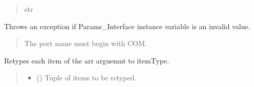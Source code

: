 \documentclass[letterpaper,10pt,english]{sphinxmanual}
\begin{document}
\begin{fulllineitems}
\begin{fulllineitems}
\begin{quote}
\begin{description}
\sphinxAtStartPar
str

\end{description}\end{quote}

\end{fulllineitems}


\begin{fulllineitems}
\label{\detokenize{Setup_PodParameters:Setup_PodParameters.Params_Interface._CheckParams}}
\pysigstartsignatures
{}
\pysigstopsignatures
\sphinxAtStartPar
Throws an exception if Params\_Interface instance variable is an invalid value.
\begin{quote}\begin{description}
\sphinxAtStartPar
{} \textendash{} The port name must begin with COM.

\end{description}\end{quote}

\end{fulllineitems}


\begin{fulllineitems}
\label{\detokenize{Setup_PodParameters:Setup_PodParameters.Params_Interface._FixTypeInTuple}}
\pysigstartsignatures
{}
\pysigstopsignatures
\sphinxAtStartPar
Retypes each item of the arr arguemnt to itemType.
\begin{quote}\begin{description}
\begin{itemize}
\item {} 
\sphinxAtStartPar
{} () \textendash{} Tuple of items to be re\sphinxhyphen{}typed.


\end{itemize}
\end{description}
\end{quote}
\end{fulllineitems}
\end{fulllineitems}
\end{document}
